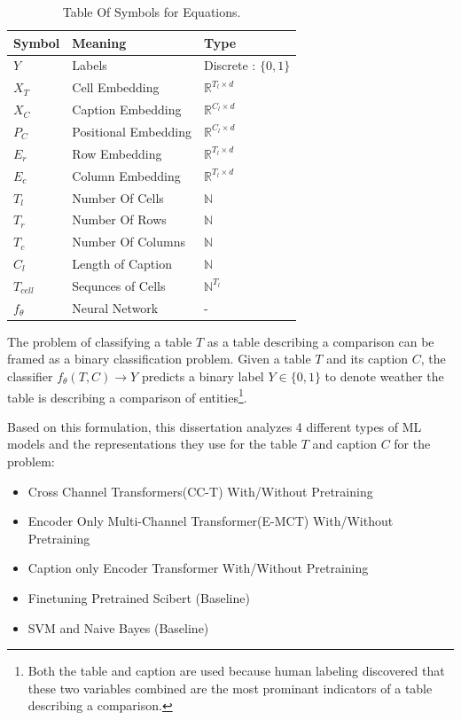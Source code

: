 \begin{table}
    \label{table\arabic{tablecounter}}
    \centering
    \begin{tabular}{|l|l|l|}
        \hline
        Symbol & Meaning & Type \\ \hline
        $Y$ & Labels & Discrete : $\{0,1\}$ \\ \hline
        $X_T$ & Cell Embedding & $\mathbb{R}^{T_l \times d}$\\ \hline
        $X_C$ & Caption Embedding & $\mathbb{R}^{C_l \times d}$ \\ \hline
        $P_C$ & Positional Embedding & $\mathbb{R}^{C_l \times d}$ \\ \hline
        $E_r$ & Row Embedding & $\mathbb{R}^{T_l \times d}$ \\ \hline
        $E_c$ & Column Embedding & $\mathbb{R}^{T_l \times d}$ \\ \hline
        $T_l$ & Number Of Cells & $\mathbb{N}$ \\ \hline
        $T_r$ & Number Of Rows & $\mathbb{N}$ \\ \hline
        $T_c$ & Number Of Columns & $\mathbb{N}$ \\ \hline
        $C_l$ & Length of Caption & $\mathbb{N}$ \\ \hline
        $T_{cell}$ & Sequnces of Cells & $\mathbb{N}^{T_l}$ \\ \hline
        $f_\theta$ & Neural Network & - \\ \hline
    \end{tabular}
    \caption{\label{tablecounter} Table Of Symbols for Equations. }
\end{table}
The problem of classifying a table $T$ as a table describing a comparison can be framed as a binary classification problem. Given a table $T$ and its caption $C$, the classifier $f_\theta(T,C) \rightarrow Y$ predicts a binary label $Y \in \{0,1\}$ to denote weather the table is describing a comparison of entities\footnote{Both the table and caption are used because human labeling discovered that these two variables combined are the most prominant indicators of a table describing a comparison.}. 

Based on this formulation, this dissertation analyzes 4 different types of ML models and the representations they use for the table $T$ and caption $C$ for the problem:
\begin{itemize}
    \item Cross Channel Transformers(CC-T) With/Without Pretraining
    \item Encoder Only Multi-Channel Transformer(E-MCT) With/Without Pretraining
    \item Caption only Encoder Transformer With/Without Pretraining 
    \item Finetuning Pretrained Scibert (Baseline)
    \item SVM and Naive Bayes (Baseline)
\end{itemize}

